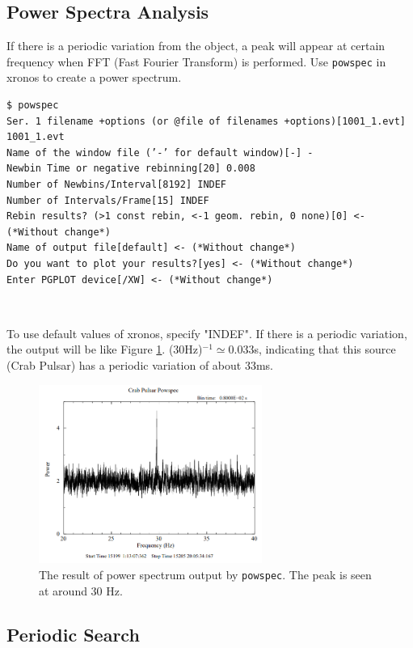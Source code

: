 \documentclass[10pt]{report}
\renewcommand{\_}{\textscale{.5}{\textbf{\textunderscore}}}
\begin{document}
\subsection{Power Spectra Analysis}\label{subsec:4.5.3}

If there is a periodic variation from the object, a peak will appear at certain frequency when FFT (Fast Fourier Transform) is performed. Use \texttt{powspec} in xronos to create a power spectrum. \\

\begin{lstlisting}
$ powspec
Ser. 1 filename +options (or @file of filenames +options)[1001_1.evt] 1001_1.evt
Name of the window file (’-’ for default window)[-] -
Newbin Time or negative rebinning[20] 0.008
Number of Newbins/Interval[8192] INDEF
Number of Intervals/Frame[15] INDEF
Rebin results? (>1 const rebin, <-1 geom. rebin, 0 none)[0] <- (*Without change*)
Name of output file[default] <- (*Without change*)
Do you want to plot your results?[yes] <- (*Without change*)
Enter PGPLOT device[/XW] <- (*Without change*)
\end{lstlisting}

\

To use default values of xronos, specify "INDEF". If there is a periodic variation, the output will be like Figure \ref{fig:5}. (30Hz)$^{-1}\simeq$0.033s, indicating that this source (Crab Pulsar) has a periodic variation of about 33ms.

\begin{figure}[hbtp!]
  \centering
  \includegraphics[width=0.65\textwidth]{4_5.png}
  \caption{The result of power spectrum output by \texttt{powspec}. The peak is seen at around 30 Hz.}
  \label{fig:5}
\end{figure}

\subsection{Periodic Search}\label{subsec:4.5.4}
\end{document}
